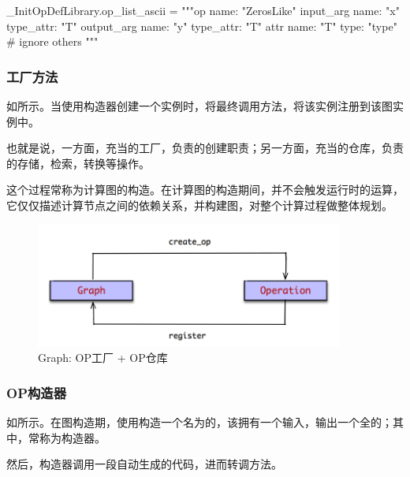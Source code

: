 \begin{content}
\begin{leftbar}
\begin{python}
_InitOpDefLibrary.op_list_ascii = """op {
  name: "ZerosLike"
  input_arg {
    name: "x"
    type_attr: "T"
  }
  output_arg {
    name: "y"
    type_attr: "T"
  }
  attr {
    name: "T"
    type: "type"
  }
}
# ignore others
"""
\end{python}
\end{leftbar}

\subsubsection{工厂方法}

如所示。当使用构造器创建一个实例时，将最终调用方法，将该实例注册到该图实例中。

也就是说，一方面，充当的工厂，负责的创建职责；另一方面，充当的仓库，负责的存储，检索，转换等操作。

这个过程常称为计算图的构造。在计算图的构造期间，并不会触发运行时的运算，它仅仅描述计算节点之间的依赖关系，并构建图，对整个计算过程做整体规划。

\begin{figure}[H]
\centering
\includegraphics[width=0.9\textwidth]{figures/py-op-factory-and-repo.png}
\caption{Graph: OP工厂 + OP仓库}
 \label{fig:py-op-factory-and-repo}
\end{figure}

\subsubsection{OP构造器}

如所示。在图构造期，使用构造一个名为的，该拥有一个输入，输出一个全的；其中，常称为构造器。

然后，构造器调用一段自动生成的代码，进而转调方法。


\end{content}
